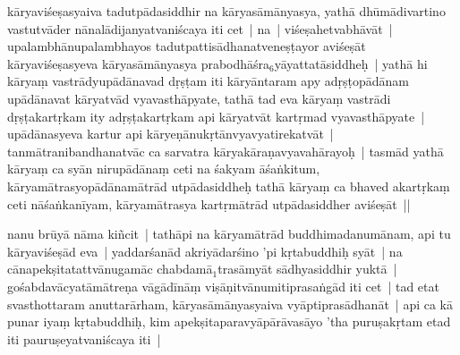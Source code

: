 \documentclass[article,12pt,a4paper]{memoir}%
\newcommand{\gap}[1]{}
\newcounter{parCount}
\begin{document}
	  
	  \pstart \leavevmode%
	\label{thakur75-37.16}kāryaviśeṣasyaiva tadutpādasiddhir na kā\gap{}ryasāmānyasya, yathā dhūmādivartino vastutvāder nānalādijanyatvaniścaya iti cet | na | viśeṣahetvabhāvāt | upalambhānupalambhayos tadutpattisādhanatveneṣṭayor aviśeṣāt kāryaviśeṣasyeva kāryasāmānyasya prabodhāśra{\tiny $_{6}$}yāyattatāsiddheḥ |\label{rnā__97385} yathā hi kāryaṃ vastrādyupādānavad \label{ratnakīrtinibandhāvali__36r1PF7IMWLD7EYP7VS6KY50CFW}dṛṣṭam iti\label{ratnakīrtinibandhāvali__36r1PF7IMWKOTSRMOPVD0OSH4J8} kāryāntaram apy adṛṣṭopādānam upādānavat \label{ratnakīrtinibandhāvali__36r1PF7IMWK15LWUW1A687BTMQB}kāryatvād vyavasthāpyate\label{ratnakīrtinibandhāvali__36r1PF7IMWJCSS30GYR134GAMFI}, tathā tad eva kāryaṃ vastrādi dṛṣṭakartṛkam ity adṛṣṭakartṛkam api kāryatvāt kartṛmad vyavasthāpyate | upādānasyeva kartur api kāryeṇānukṛtānvyavyatirekatvāt | tanmātranibandhanatvāc ca sarvatra kāryakāraṇavyavahārayoḥ | tasmād yathā kārya\leavevmode{}\label{RNAms_21b}ṃ ca syān nirupādānaṃ ceti na śakyam āśaṅkitum, kāryamātrasyopādānamātrād utpādasiddheḥ tathā kāryaṃ ca bhaved akartṛkaṃ ceti nāśaṅkanīyam, kāryamātrasya kartṛmātrād utpādasiddher aviśeṣāt ||\label{thakur-75-37.26}
	{}
	\pend%
      

	  
	  \pstart \leavevmode%
	\label{thakur75-37.26}nanu brūyā nāma kiñcit | tathāpi na kāryamātrād buddhimadanumānam, api tu kāryaviśeṣād eva | yaddarśanād akriyādarśino 'pi kṛtabuddhiḥ syāt | na cānapekṣitatattvānugamāc chabdamā{\tiny $_{1}$}trasāmyāt sādhyasiddhir yuktā | gośabdavācyatāmātreṇa vāgādīnāṃ viṣāṇitvānumitiprasaṅgād iti cet | tad etat svasthottaram anuttarārham, kāryasāmānyasyaiva vyāptiprasādhanāt | api ca kā punar iyaṃ kṛtabuddhiḥ, kim apekṣitaparavyāpārāvasāyo 'tha puruṣakṛtam etad iti pauruṣeyatvaniścaya iti |
	{}
	\pend%
      
\end{document}
